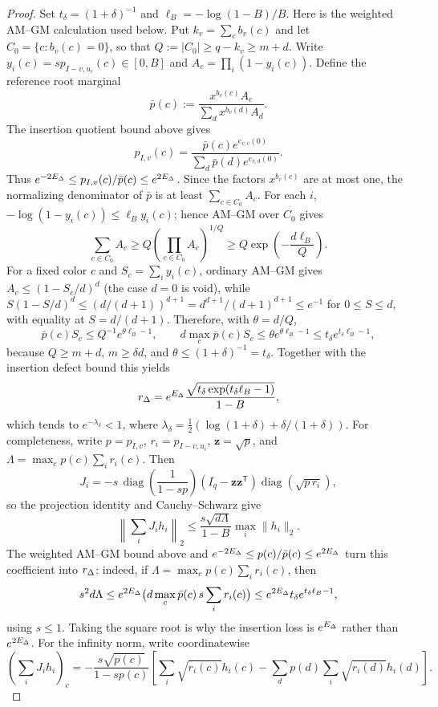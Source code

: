 \begin{proof}
Set $t_\delta=(1+\delta)^{-1}$ and
$\ell_B=-\log(1-B)/B$.  Here is the weighted AM--GM calculation used
below.  Put $k_v=\sum_cb_v(c)$ and let
$C_0=\{c:b_v(c)=0\}$, so that
$Q:=|C_0|\ge q-k_v\ge m+d$.  Write
$y_i(c)=s p_{I-v,u_i}(c)\in[0,B]$ and
$A_c=\prod_i(1-y_i(c))$.  Define the reference root marginal
\[
  \bar p(c):=\frac{x^{b_v(c)}A_c}{\sum_d x^{b_v(d)}A_d}.
\]
The insertion quotient bound above gives
\[
 p_{I,v}(c)=
 \frac{\bar p(c)e^{e_{v,c}(0)}}
      {\sum_d\bar p(d)e^{e_{v,d}(0)}}.
\]
Thus \(e^{-2E_\Delta}\le p_{I,v}(c)/\bar p(c)\le e^{2E_\Delta}\).
Since the factors $x^{b_v(c)}$ are at most one,
the normalizing denominator of $\bar p$ is at least
$\sum_{c\in C_0}A_c$.  For each $i$,
$-\log(1-y_i(c))\le\ell_B y_i(c)$; hence AM--GM over $C_0$ gives
\[
 \sum_{c\in C_0}A_c
 \ge Q\left(\prod_{c\in C_0}A_c\right)^{1/Q}
 \ge Q\exp\!\left(-\frac{d\ell_B}{Q}\right).
\]
For a fixed color $c$ and $S_c=\sum_i y_i(c)$, ordinary AM--GM gives
$A_c\le(1-S_c/d)^d$ (the case $d=0$ is void), while
$S(1-S/d)^d\le (d/(d+1))^{d+1}=d^{d+1}/(d+1)^{d+1}\le e^{-1}$ for $0\le S\le d$, with equality at $S=d/(d+1)$.
Therefore, with $\theta=d/Q$,
\[
 \bar p(c)S_c\le Q^{-1}e^{\theta\ell_B-1},\qquad
 d\max_c\bar p(c)S_c
 \le\theta e^{\theta\ell_B-1}
 \le t_\delta e^{t_\delta\ell_B-1},
\]
because $Q\ge m+d$, $m\ge\delta d$, and
$\theta\le(1+\delta)^{-1}=t_\delta$.  Together with the insertion
defect bound this yields
\[
 r_\Delta=e^{E_\Delta}
 \frac{\sqrt{t_\delta\exp(t_\delta\ell_B-1)}}{1-B},
\]
which tends to $e^{-\lambda_\delta}<1$, where
$\lambda_\delta=\tfrac12(\log(1+\delta)+\delta/(1+\delta))$.
For completeness, write $p=p_{I,v}$, $r_i=p_{I-v,u_i}$,
$\mathbf z=\sqrt p$, and
$\Lambda=\max_c p(c)\sum_i r_i(c)$.  Then
\[
 J_i=-s\,\operatorname{diag}\!\left(\frac1{1-sp}\right)
 (I_q-\mathbf z\mathbf z^{\mathsf T})\operatorname{diag}\!\left(\sqrt{p\,r_i}\right),
\]
so the projection identity and Cauchy--Schwarz give
\[
 \left\|\sum_iJ_ih_i\right\|_2
 \le\frac{s\sqrt{d\Lambda}}{1-B}\max_i\|h_i\|_2.
\]
The weighted AM--GM bound above and
$e^{-2E_\Delta}\le p(c)/\bar p(c)\le e^{2E_\Delta}$
turn this coefficient into $r_\Delta$: indeed, if
$\Lambda=\max_c p(c)\sum_i r_i(c)$, then
\[
 s^2d\Lambda\le e^{2E_\Delta}
 \bigl(d\max_c\bar p(c)\,s\sum_i r_i(c)\bigr)
 \le e^{2E_\Delta}t_\delta e^{t_\delta\ell_B-1},
\]
using $s\le1$.  Taking the square root is why the insertion loss is
$e^{E_\Delta}$ rather than $e^{2E_\Delta}$.  For the infinity norm, write
coordinatewise
\[
 \left(\sum_iJ_ih_i\right)_c
 =-\frac{s\sqrt{p(c)}}{1-sp(c)}
 \left[\sum_i\sqrt{r_i(c)}h_i(c)
 -\sum_d p(d)\sum_i\sqrt{r_i(d)}h_i(d)\right].
\]
\end{proof}
